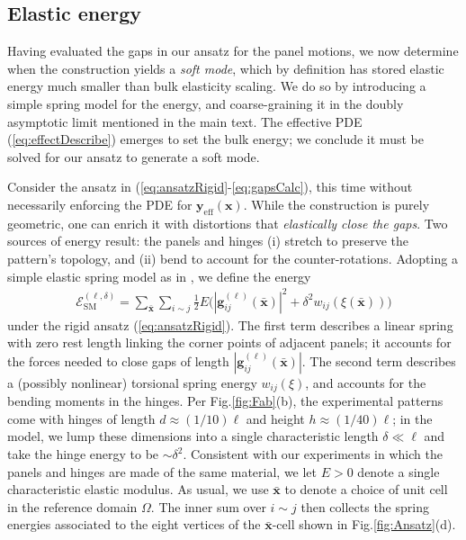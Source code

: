 \documentclass[aps,11pt,tightenlines,notitlepage,superscriptaddress,longbibliography,nofootinbib]{revtex4-1}
\begin{document}
\subsection{Elastic energy}

Having evaluated the gaps in our ansatz for the panel motions, we now determine when the construction yields a \textit{soft mode}, which by definition has stored elastic energy much smaller than bulk elasticity scaling. We do so by introducing a simple spring model for the energy, and coarse-graining it in the doubly asymptotic limit mentioned in the main text.  The effective PDE (\ref{eq:effectDescribe}) emerges to set the bulk energy; we conclude it must  be solved for our ansatz to generate a soft mode.

Consider the ansatz in (\ref{eq:ansatzRigid}-\ref{eq:gapsCalc}), this time without necessarily enforcing the PDE for $\mathbf{y}_\text{eff}(\mathbf{x})$. While the construction is purely geometric, one can enrich it with  distortions that \textit{elastically close the gaps}. Two sources of energy result: the panels and hinges (i) stretch to preserve the pattern's topology, and (ii) bend to account for the counter-rotations. Adopting a simple elastic spring model as in \cite{Deng2020}, we define the energy
\begin{equation}
    \begin{aligned}
    \mathcal{E}_{\text{SM}}^{(\ell,\delta)} = \sum_{\bar{\mathbf{x}}} \sum_{i\sim j} \frac{1}{2}E \Big( |\mathbf{g}_{ij}^{(\ell)}(\bar{\mathbf{x}})|^2  + \delta^2 w_{ij}(\xi(\bar{\mathbf{x}})) \Big)  
    \end{aligned}
\end{equation}
under the rigid ansatz (\ref{eq:ansatzRigid}). The first term describes a linear spring with zero rest length linking the corner points of adjacent panels; it accounts for the forces needed to close gaps of length $|\mathbf{g}_{ij}^{(\ell)}(\bar{\mathbf{x}})|$.  The second term describes a (possibly nonlinear) torsional spring energy $w_{ij}(\xi)$, and accounts for the bending moments in the hinges.  Per Fig.\;\ref{fig:Fab}(b), the experimental patterns come with hinges of length $d \approx (1/10)\ell$ and height $h \approx (1/40)\ell$; in the model, we lump these dimensions into a single characteristic length $\delta \ll \ell$ and take the hinge energy to be $\sim \delta^2$. Consistent with our experiments in which the panels and hinges are made of the same material, we let $E >0$ denote a single characteristic elastic modulus. As usual, we use $\bar{\mathbf{x}}$ to denote a choice of unit cell in the  reference domain $\Omega$. The inner sum over $i\sim j$ then collects the spring energies associated to the eight vertices of the $\bar{\mathbf{x}}$-cell shown in Fig.\;\ref{fig:Ansatz}(d). 
\end{document}
